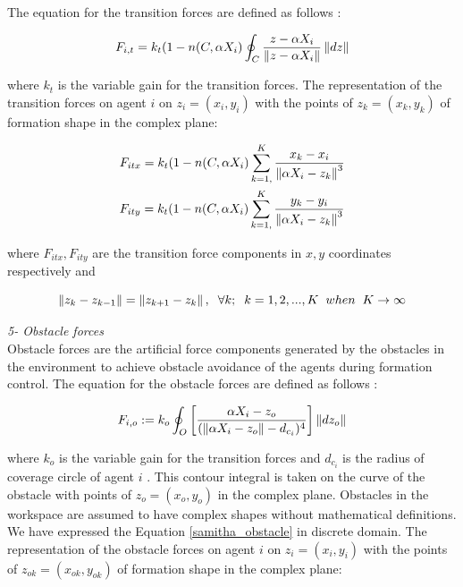 The equation for the transition forces are defined as follows \cite{17}:	
				
\begin{equation}
F_{i,t} = k_t (1-n(C,\alpha X_i) \oint_C \frac{z-\alpha X_i}{\left\lVert z-\alpha X_i\right\rVert}\left\lVert dz\right\rVert
\end{equation}
				
where $k_t$ is the variable gain for the transition forces. The representation of the transition forces on agent $i$ on $z_i = (x_i, y_i)$ with the points of  $z_k = (x_k,y_k)$ of formation shape in the complex plane:
			
\begin{align}
\begin{split}
&F_{itx} = k_t  (1-n(C,\alpha X_i) \sum_{k=1,}^{K}\frac{x_k- x_i}{\left\lVert\alpha X_i - z_k\right\rVert^3}\\
&F_{ity} = k_t  (1-n(C,\alpha X_i) \sum_{k=1,}^{K}\frac{y_k- y_i}{\left\lVert\alpha X_i - z_k\right\rVert^3}\\
\end{split}
\end{align}
			
where  $F_{itx} , F_{ity} $ are the transition force components in $x,y$ coordinates respectively and

\begin{equation}
\left\lVert z_k - z_{k-1}\right\rVert = \left\lVert z_{k+1} - z_k\right\rVert, \hspace{0.2cm}  \forall k ;  \hspace{0.2cm} k=1,2,...,K \hspace{0.2cm} when  \hspace{0.2cm} K \to\infty
\end{equation}					
			
\textit{			5- Obstacle forces} \\ 
Obstacle forces are the artificial force components generated by the obstacles in the environment to achieve obstacle avoidance of the agents during formation control. 	
The equation for the obstacle forces are defined as follows \cite{17}:	
			
\begin{equation} \label{samitha_obstacle}
F_{i,o} := k_o  \oint_O \left[\frac{\alpha X_i - z_o}{(\left\lVert\alpha X_i - z_o\right\rVert - d_{c_i})^4}\right] \left\lVert dz_o\right\rVert
\end{equation}
			
where $k_o$ is the variable gain for the transition forces and $d_{c_i}$ is the radius of coverage circle of agent $i$ . This contour integral is taken on the curve of the obstacle with  points of $z_o = (x_o,y_o)$ in the complex plane. Obstacles in the workspace are assumed to have complex shapes without mathematical definitions. We have expressed the Equation \ref{samitha_obstacle} in discrete domain. The representation of the obstacle forces on agent $i$ on $z_i = (x_i, y_i)$ with the points of  $z_{ok} = (x_{ok},y_{ok})$ of formation shape in the complex plane:
			
